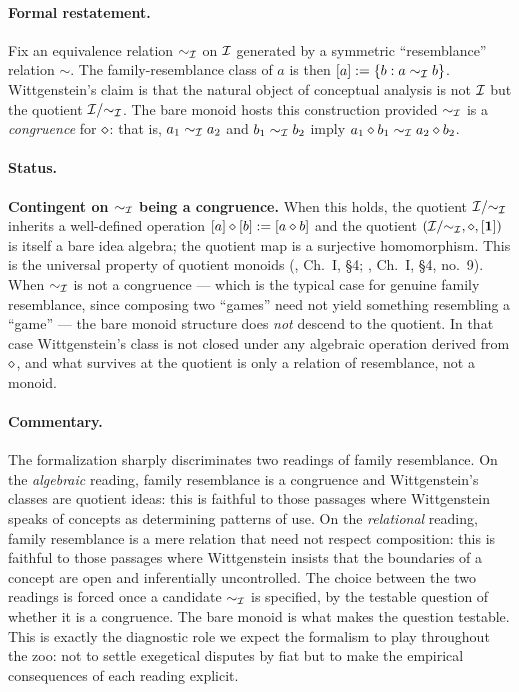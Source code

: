 \paragraph{Formal restatement.}
Fix an equivalence relation $\sim_{\mathcal{I}}$ on $\mathcal{I}$ generated by a
symmetric ``resemblance'' relation $\sim$.  The family-resemblance class
of $a$ is then $[a] \mathrel{:=} \{ b : a \sim_{\mathcal{I}} b \}$.  Wittgenstein's
claim is that the natural object of conceptual analysis is not $\mathcal{I}$
but the quotient $\mathcal{I} / {\sim_{\mathcal{I}}}$.  The bare monoid hosts this
construction provided $\sim_{\mathcal{I}}$ is a \emph{congruence} for $\mathbin{\diamond}$:
that is, $a_1 \sim_{\mathcal{I}} a_2$ and $b_1 \sim_{\mathcal{I}} b_2$ imply
$a_1 \mathbin{\diamond} b_1 \sim_{\mathcal{I}} a_2 \mathbin{\diamond} b_2$.

\paragraph{Status.}
\textbf{Contingent on $\sim_{\mathcal{I}}$ being a congruence.}  When this holds,
the quotient $\mathcal{I} / {\sim_{\mathcal{I}}}$ inherits a well-defined operation
$[a] \mathbin{\diamond} [b] \mathrel{:=} [a \mathbin{\diamond} b]$ and the quotient $(\mathcal{I} /
{\sim_{\mathcal{I}}}, \mathbin{\diamond}, [\mathbf{1}])$ is itself a bare idea algebra; the
quotient map is a surjective homomorphism.  This is the universal
property of quotient monoids (\cite{MacLane1998}, Ch.~I, \S 4;
\cite{Bourbaki1989}, Ch.~I, \S 4, no.~9).  When $\sim_{\mathcal{I}}$ is not a
congruence --- which is the typical case for genuine family resemblance,
since composing two ``games'' need not yield something resembling a
``game'' --- the bare monoid structure does \emph{not} descend to the
quotient.  In that case Wittgenstein's class is not closed under any
algebraic operation derived from $\mathbin{\diamond}$, and what survives at the
quotient is only a relation of resemblance, not a monoid.

\paragraph{Commentary.}
The formalization sharply discriminates two readings of family
resemblance.  On the \emph{algebraic} reading, family resemblance is a
congruence and Wittgenstein's classes are quotient ideas: this is
faithful to those passages where Wittgenstein speaks of concepts as
determining patterns of use.  On the \emph{relational} reading, family
resemblance is a mere relation that need not respect composition: this
is faithful to those passages where Wittgenstein insists that the
boundaries of a concept are open and inferentially uncontrolled.  The
choice between the two readings is forced once a candidate $\sim_{\mathcal{I}}$
is specified, by the testable question of whether it is a congruence.
The bare monoid is what makes the question testable.  This is exactly the
diagnostic role we expect the formalism to play throughout the zoo: not
to settle exegetical disputes by fiat but to make the empirical
consequences of each reading explicit.

